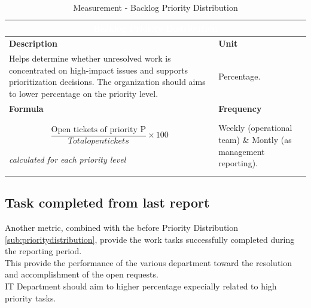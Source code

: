 \begin{table}[H]
    \centering
    \renewcommand{\arraystretch}{1.6}
    \setlength{\arrayrulewidth}{0.6pt}

    \begin{tabularx}{\textwidth}{|X|X|}
    \hline
    \multicolumn{2}{|c|}{\cellcolor{mcblue}\textcolor{white}{\textbf{Backlog Priority Distribution}}} \\ \hline

    \rowcolor{mclightgray}
    \textbf{Description} & \textbf{Unit} \\ \hline
    Helps determine whether unresolved work is concentrated on high-impact issues and supports prioritization decisions. The organization should aims to lower percentage on the priority level. &
    Percentage. \\ \hline

    \rowcolor{mclightgray}
    \textbf{Formula} & \textbf{Frequency} \\ \hline
    \[
     \frac{\text{Open tickets of priority P}}{Total open tickets} \times 100
    \]
    
    \textit{calculated for each priority level}
    
     &
    Weekly (operational team) \& Montly (as management reporting). \\ \hline

    \end{tabularx}

    \caption{Measurement - Backlog Priority Distribution}
    \label{tab:measurement_backlogPriorityDistribution}
\end{table}



\subsection{Task completed from last report}
\label{sub:taskcompleted}
Another metric, combined with the before Priority Distribution \ref{sub:prioritydistribution}, provide the work tasks successfully completed during the reporting period. \\
This provide the performance of the various department toward the resolution and accomplishment of the open requests. \\
IT Department should aim to higher percentage expecially related to high priority tasks.

